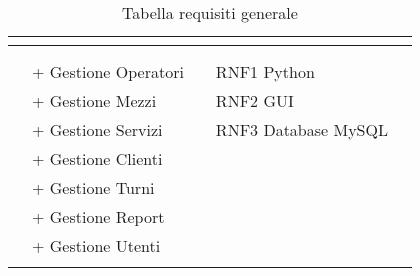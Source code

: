\documentclass[green, fancy, 11pt]{elegantbook}
\begin{document}
\begin{table}[H]
	\footnotesize
\centering
\begin{tabular}{|p{0.2cm} p{2.5cm} p{1.85cm} p{0.2cm} p{2.5cm} p{1.85cm} p{0.2cm}|}
	\hline
	\multicolumn{7}{|c|}{\cellcolor{DarkGreen}{\textcolor{white}{REQUISITI}}}\\
	\hline
	&&&&&&\\
	\cline{2-3} \cline{5-6}
	&\multicolumn{2}{|l|}{\cellcolor{RussianGreen}{\textcolor{white}{FUNZIONALI}}}&&\multicolumn{2}{|l|}{\cellcolor{RussianGreen}{\textcolor{white}{NON FUNZIONALI}}}&\\
	\cline{2-3} \cline{5-6}
	&\multicolumn{2}{|l|}{+ Gestione Operatori}&&\multicolumn{2}{|l|}{RNF1 Python}&\\ 
	&\multicolumn{2}{|l|}{+ Gestione Mezzi}&&\multicolumn{2}{|l|}{RNF2 GUI}&\\ 
	&\multicolumn{2}{|l|}{+ Gestione Servizi}&&\multicolumn{2}{|l|}{RNF3 Database MySQL}&\\ 
	\cline{5-6}
	&\multicolumn{2}{|l|}{+ Gestione Clienti}&&&&\\
	&\multicolumn{2}{|l|}{+ Gestione Turni}&&&&\\
	&\multicolumn{2}{|l|}{+ Gestione Report}&&&&\\
	&\multicolumn{2}{|l|}{+ Gestione Utenti}&&&&\\
	\cline{2-3}
	&&&&&&\\
	\hline
\end{tabular}
\caption{Tabella requisiti generale}
\end{table}
\end{document}
